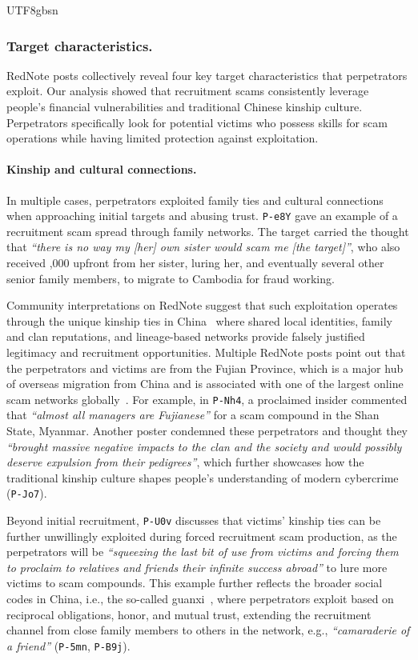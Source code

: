 \documentclass[sigconf,nonacm]{acmart}
\begin{document}
\begin{CJK}{UTF8}{gbsn}
\subsubsection{Target characteristics.}
\label{sec:target_characteristics}

RedNote posts collectively reveal four key target characteristics that perpetrators exploit. Our analysis showed that recruitment scams consistently leverage people's financial vulnerabilities and traditional Chinese kinship culture. Perpetrators specifically look for potential victims who possess skills for scam operations while having limited protection against exploitation.

\paragraph{\textbf{Kinship and cultural connections.}} In multiple cases, perpetrators exploited family ties and cultural connections when approaching initial targets and abusing trust. \texttt{P-e8Y} gave an example of a recruitment scam spread through family networks. The target carried the thought that \textit{``there is no way my [her] own sister would scam me [the target]''}, who also received ,000 upfront from her sister, luring her, and eventually several other senior family members, to migrate to Cambodia for fraud working.

Community interpretations on RedNote suggest that such exploitation operates through the unique kinship ties in China~\cite{chun-ca96} where shared local identities, family and clan reputations, and lineage-based networks provide falsely justified legitimacy and recruitment opportunities. Multiple RedNote posts point out that the perpetrators and victims are from the Fujian Province, which is a major hub of overseas migration from China and is associated with one of the largest online scam networks globally~\cite{theguardian-2024}. For example, in \texttt{P-Nh4}, a proclaimed insider commented that \textit{``almost all managers are Fujianese''} for a scam compound in the Shan State, Myanmar. Another poster condemned these perpetrators and thought they \textit{``brought massive negative impacts to the clan and the society and would possibly deserve expulsion from their pedigrees''}, which further showcases how the traditional kinship culture shapes people's understanding of modern cybercrime (\texttt{P-Jo7}).

Beyond initial recruitment, \texttt{P-U0v} discusses that victims' kinship ties can be further unwillingly exploited during forced recruitment scam production, as the perpetrators will be \textit{``squeezing the last bit of use from victims and forcing them to proclaim to relatives and friends their infinite success abroad''} to lure more victims to scam compounds. This example further reflects the broader social codes in China, i.e., the so-called guanxi~\cite{chen2004intricacies}, where perpetrators exploit based on reciprocal obligations, honor, and mutual trust, extending the recruitment channel from close family members to others in the network, e.g., \textit{``camaraderie of a friend''} (\texttt{P-5mn}, \texttt{P-B9j}).


\end{CJK}
\end{document}
